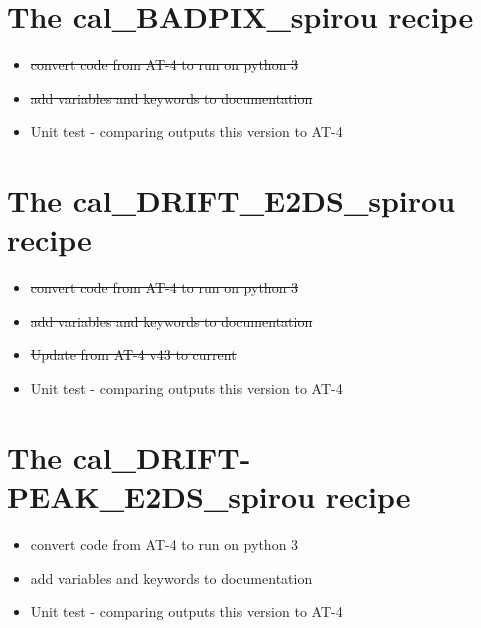 \section{The cal\_BADPIX\_spirou recipe}
\label{ch:todo:cal_BADPIX_spirou}

\begin{itemize}
	\item \sout{convert code from AT-4 to run on python 3}
	\item \sout{add variables and keywords to documentation}
	\item Unit test - comparing outputs this version to AT-4
\end{itemize}


\section{The cal\_DRIFT\_E2DS\_spirou recipe}
\label{ch:todo:cal_DRIFT_E2DS_spirou}

\begin{itemize}
	\item \sout{convert code from AT-4 to run on python 3}
	\item \sout{add variables and keywords to documentation}
	\item \sout{Update from AT-4 v43 to current}
	\item Unit test - comparing outputs this version to AT-4
\end{itemize}


\section{The cal\_DRIFT-PEAK\_E2DS\_spirou recipe}
\label{ch:todo:cal_DRIFTPEAK_E2DS_spirou}

\begin{itemize}
	\item convert code from AT-4 to run on python 3
	\item add variables and keywords to documentation
	\item Unit test - comparing outputs this version to AT-4
\end{itemize}


